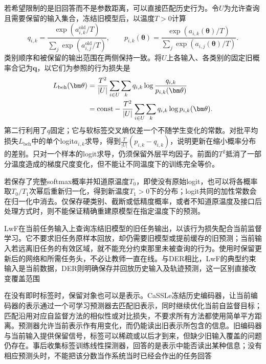 若希望限制的是旧回答而不是参数距离，可以直接匹配历史行为。令$U$为允许查询且需要保留的输入集合，冻结旧模型后，以温度$T>0$计算
\[
q_{i,k}=\frac{\exp(a^{\mathrm{old}}_{i,k}/T)}
{\sum_j\exp(a^{\mathrm{old}}_{i,j}/T)},\qquad
p_{i,k}(\bm\theta)=\frac{\exp(a_{i,k}(\bm\theta)/T)}
{\sum_j\exp(a_{i,j}(\bm\theta)/T)}.
\]
类别顺序和被保留的输出范围在两侧保持一致。将$U$上各输入、各类别的固定旧概率合记为$\bm q$，以它们为参照的行为损失是
\begin{align}
L_{\mathrm{beh}}(\bm\theta)
&=\frac{T^2}{|U|}\sum_{i\in U}\sum_k
q_{i,k}\log\frac{q_{i,k}}{p_{i,k}(\bm\theta)}\notag\\
&=\mathrm{const}
-\frac{T^2}{|U|}\sum_{i\in U}\sum_k q_{i,k}\log p_{i,k}(\bm\theta).
\label{eq:ket-update-behavior}
\end{align}
第二行利用了$q$固定；它与软标签交叉熵仅差一个不随学生变化的常数。对批平均损失$L_{\mathrm{beh}}$中的单个logit$a_{i,k}$求导，得到$\frac{T}{|U|}(p_{i,k}-q_{i,k})$，说明更新在缩小概率分布的差别。只对一个样本的logit求导，仍须保留外层平均因子。前面的$T^2$抵消了一部分温度造成的梯度尺度变化，但不能让不同温度下的训练完全等价。

若保存了完整softmax概率并知道原温度$T_0$，即使没有原始logit，也可以将各概率取$T_0/T_1$次幂后重新归一化，得到新温度$T_1>0$下的分布；logit共同的加性常数会在归一化中消去。仅保存硬类别、截断或低精度概率，或者不知道原温度及接口后处理方式时，则不能保证精确重建原模型在指定温度下的预测。

LwF在当前任务输入上查询冻结旧模型的旧任务输出，以该行为损失配合当前监督学习。它不要求旧任务原样本回放，却仍需要旧模型或提前缓存的旧预测；当前输入若远离旧任务的有效区域，就不能充分约束那里未被查询的行为。使用时保留更新后的网络和所需任务头，不必让教师一直在线。与DER相比，LwF的典型约束输入是当前数据，DER则明确保存并回放历史输入及轨迹预测，这一区别直接改变覆盖范围

在没有即时标签时，保留对象也可以是表示。CaSSLe冻结历史编码器，让当前编码器的表示通过一个可学习预测器去匹配旧表示，同时继续优化当前自监督目标；匹配沿用对应自监督方法的相似性或对比损失，不要求所有方法都使用简单平方距离。预测器允许当前表示作有用变化，而仍能读出旧表示所包含的信息。旧编码器与当前输入提供保留信号，标签可以稀疏或以后才到来，但缺少旧输入覆盖的问题仍存在。事后收集标签训练线性探测器，回答的是表示中能否读出某种信息；没有相应预测头时，不能把该分数当作系统当时已经会作出的任务回答

